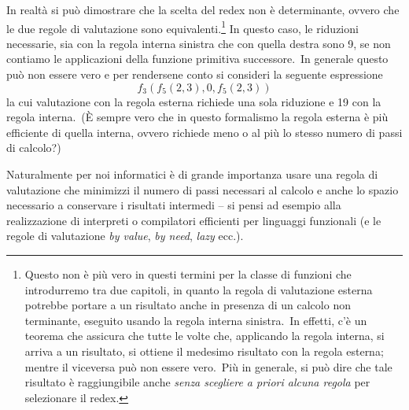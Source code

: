 \begin{example}{\label{Somma}}
    \noindent In realtà si può dimostrare che la scelta del redex non è determinante, ovvero che le due regole di valutazione sono equivalenti.\footnote{Questo non è più vero in questi termini per la classe di funzioni che introdurremo tra due capitoli, in quanto la regola di valutazione esterna potrebbe portare a un risultato anche in presenza di un calcolo non terminante, eseguito usando la regola interna sinistra.\
        In effetti, c'è un teorema che assicura che tutte le volte che, applicando la regola interna, si arriva a un risultato, si ottiene il medesimo risultato con la regola esterna; mentre il viceversa può non essere vero.\ Più in generale, si può dire che tale risultato è raggiungibile anche \textit{senza scegliere a priori alcuna regola} per selezionare il redex.}
    In questo caso, le riduzioni necessarie, sia con la regola interna sinistra che con quella destra sono 9, se non contiamo le applicazioni della funzione primitiva successore.\
    In generale questo può non essere vero e per rendersene conto si consideri la seguente espressione
    \[f_3(f_5(2, 3), 0, f_5(2, 3))\]
    la cui valutazione con la regola esterna richiede una sola riduzione e 19 con la    regola interna.\
    (È sempre vero che in questo formalismo la regola esterna è più efficiente di quella interna, ovvero richiede meno o al più lo stesso numero di passi di calcolo?)

    Naturalmente per noi informatici è di grande importanza usare una regola di valutazione che minimizzi il numero di passi necessari al calcolo e anche lo spazio necessario a conservare i risultati intermedi -- si pensi ad esempio alla realizzazione di interpreti o compilatori efficienti per linguaggi funzionali (e
    le regole di valutazione \textit{by value}, \textit{by need}, \textit{lazy} ecc.).


\end{example}
